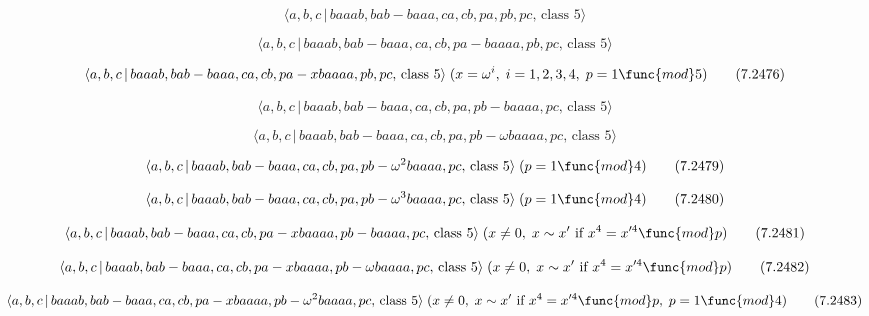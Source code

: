 \documentclass[10pt]{article}
\begin{document}
\begin{equation}
\langle a,b,c\,|\,baaab,bab-baaa,ca,cb,pa,pb,pc,\,\text{class }5\rangle 
\tag{7.2474}
\end{equation}

\begin{equation}
\langle a,b,c\,|\,baaab,bab-baaa,ca,cb,pa-baaaa,pb,pc,\,\text{class }5\rangle
\tag{7.2475}
\end{equation}

\begin{equation}
\langle a,b,c\,|\,baaab,bab-baaa,ca,cb,pa-xbaaaa,pb,pc,\,\text{class }%
5\rangle \;(x=\omega ^{i},\;i=1,2,3,4,\;p=1\func{mod}5)  \tag{7.2476}
\end{equation}

\begin{equation}
\langle a,b,c\,|\,baaab,bab-baaa,ca,cb,pa,pb-baaaa,pc,\,\text{class }5\rangle
\tag{7.2477}
\end{equation}

\begin{equation}
\langle a,b,c\,|\,baaab,bab-baaa,ca,cb,pa,pb-\omega baaaa,pc,\,\text{class }%
5\rangle  \tag{7.2478}
\end{equation}

\begin{equation}
\langle a,b,c\,|\,baaab,bab-baaa,ca,cb,pa,pb-\omega ^{2}baaaa,pc,\,\text{%
class }5\rangle \;(p=1\func{mod}4)  \tag{7.2479}
\end{equation}

\begin{equation}
\langle a,b,c\,|\,baaab,bab-baaa,ca,cb,pa,pb-\omega ^{3}baaaa,pc,\,\text{%
class }5\rangle \;(p=1\func{mod}4)  \tag{7.2480}
\end{equation}

\begin{equation}
\langle a,b,c\,|\,baaab,bab-baaa,ca,cb,pa-xbaaaa,pb-baaaa,pc,\,\text{class }%
5\rangle \;(x\neq 0,\;x\sim x^{\prime }\text{ if }x^{4}=x^{\prime 4}\func{mod%
}p)  \tag{7.2481}
\end{equation}

\begin{equation}
\langle a,b,c\,|\,baaab,bab-baaa,ca,cb,pa-xbaaaa,pb-\omega baaaa,pc,\,\text{%
class }5\rangle \;(x\neq 0,\;x\sim x^{\prime }\text{ if }x^{4}=x^{\prime 4}%
\func{mod}p)  \tag{7.2482}
\end{equation}

\begin{equation}
\langle a,b,c\,|\,baaab,bab-baaa,ca,cb,pa-xbaaaa,pb-\omega ^{2}baaaa,pc,\,%
\text{class }5\rangle \;(x\neq 0,\;x\sim x^{\prime }\text{ if }%
x^{4}=x^{\prime 4}\func{mod}p,\;p=1\func{mod}4)  \tag{7.2483}
\end{equation}
\end{document}
